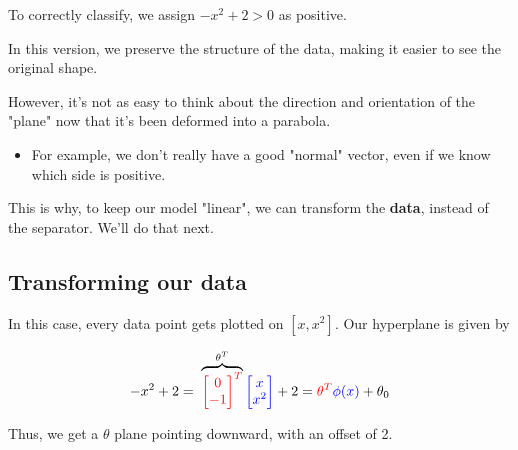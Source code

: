            To correctly classify, we assign $-x^2+2>0$ as positive.
    
            In this version, we preserve the structure of the data, making it easier to see the original shape. 

            However, it's not as easy to think about the direction and orientation of the "plane" now that it's been deformed into a parabola. 
            
            \begin{itemize}
                \item For example, we don't really have a good "normal" vector, even if we know which side is positive.
            \end{itemize}
            
            This is why, to keep our model "linear", we can transform the \textbf{data}, instead of the separator. We'll do that next.
    
            \subsecdiv

        \subsection{Transforming our data}
    
            In this case, every data point gets plotted on $[x,x^2]$. Our hyperplane is given by 
    
            \begin{equation}
                -x^2+2 =\;
                \overbrace{
                \textcolor{red}{\begin{bmatrix}
                    0 \\ -1
                \end{bmatrix}^T}
                }^{\theta^T}
                \textcolor{blue}{\begin{bmatrix}
                    x \\ x^2
                \end{bmatrix}}
                + 2
                =
                \textcolor{red}{\theta^T}\textcolor{blue}{\phi(x)} + \theta_0
            \end{equation}
    
            Thus, we get a $\theta$ plane pointing downward, with an offset of 2.
    
